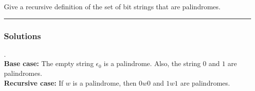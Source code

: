 \newpage
\begin{question}
Give a recursive definition of the set of bit strings that are palindromes.
\end{question}

\par\noindent\rule{\textwidth}{0.5pt}

\subsubsection*{Solutions}

\begin{definition}
    .\\
    \textbf{Base case: } The empty string $\epsilon_0$ is a palindrome. Also, the string $0$ and $1$ are palindromes.\\
    \textbf{Recursive case: } If $w$ is a palindrome, then $0w0$ and $1w1$ are palindromes.\\
\end{definition}